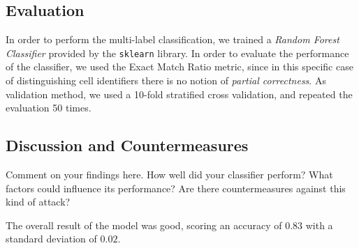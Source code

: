 \documentclass[10pt,conference,compsocconf]{IEEEtran}
\begin{document}
\subsection{Evaluation}
In order to perform the multi-label classification, we trained a \textit{Random Forest Classifier} provided by the \texttt{sklearn} library. In order to evaluate the performance of the classifier, we used the Exact Match Ratio metric, since in this specific case of distinguishing cell identifiers there is no notion of \textit{partial correctness}. As validation method, we used a 10-fold stratified cross validation, and repeated the evaluation 50 times.


\subsection{Discussion and Countermeasures}

Comment on your findings here. How well did your classifier perform? What
factors could influence its performance? Are there countermeasures against this
kind of attack?

The overall result of the model was good, scoring an accuracy of $0.83$ with a standard deviation of $0.02$.


\printbibliography
\end{document}
